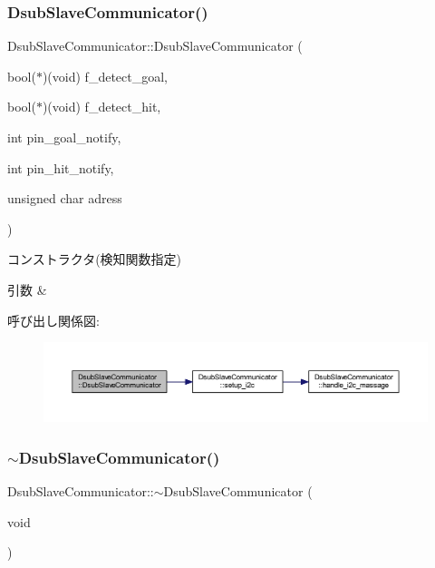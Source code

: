 \subsubsection{\texorpdfstring{DsubSlaveCommunicator()}{DsubSlaveCommunicator()}\hspace{0.1cm}{\footnotesize\ttfamily [2/2]}}
{\footnotesize\ttfamily Dsub\+Slave\+Communicator\+::\+Dsub\+Slave\+Communicator (\begin{DoxyParamCaption}\item[{bool($\ast$)(void)}]{f\+\_\+detect\+\_\+goal,  }\item[{bool($\ast$)(void)}]{f\+\_\+detect\+\_\+hit,  }\item[{int}]{pin\+\_\+goal\+\_\+notify,  }\item[{int}]{pin\+\_\+hit\+\_\+notify,  }\item[{unsigned char}]{adress }\end{DoxyParamCaption})}



コンストラクタ(検知関数指定) 


\begin{DoxyParams}{引数}
{\em } & \\
\hline
\end{DoxyParams}
呼び出し関係図\+:
\nopagebreak
\begin{figure}[H]
\begin{center}
\leavevmode
\includegraphics[width=350pt]{class_dsub_slave_communicator_a30697bf0229412f27e59a6f7c1b5843a_cgraph}
\end{center}
\end{figure}
\mbox{\label{class_dsub_slave_communicator_af3369086cde883a07f686203a41aab13}} 
\subsubsection{\texorpdfstring{$\sim$DsubSlaveCommunicator()}{~DsubSlaveCommunicator()}}
{\footnotesize\ttfamily Dsub\+Slave\+Communicator\+::$\sim$\+Dsub\+Slave\+Communicator (\begin{DoxyParamCaption}\item[{void}]{ }\end{DoxyParamCaption})}



